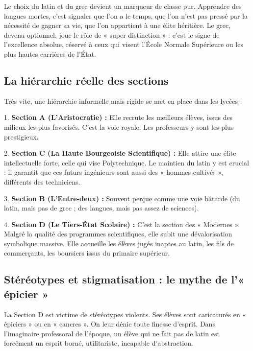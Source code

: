 Le choix du latin et du grec devient un marqueur de classe pur. Apprendre des langues mortes, c'est
signaler que l'on a le temps, que l'on n'est pas pressé par la nécessité de gagner sa vie, que l'on
appartient à une élite héritière. Le grec, devenu optionnel, joue le rôle de « super-distinction » :
c'est le signe de l'excellence absolue, réservé à ceux qui visent l'École Normale Supérieure ou les
plus hautes carrières de l'État.\cite{I-2-1-ref6}



\subsection{La hiérarchie réelle des sections}

Très vite, une hiérarchie informelle mais rigide se met en place dans les lycées :

1. \textbf{Section A (L'Aristocratie) :} Elle recrute les meilleurs élèves, issus des milieux les
plus favorisés. C'est la voie royale. Les professeurs y sont les plus prestigieux.

2. \textbf{Section C (La Haute Bourgeoisie Scientifique) :} Elle attire une élite intellectuelle
forte, celle qui vise Polytechnique. Le maintien du latin y est crucial : il garantit que ces futurs
ingénieurs sont aussi des « hommes cultivés », différents des techniciens.\cite{I-2-1-ref5}

3. \textbf{Section B (L'Entre-deux) :} Souvent perçue comme une voie bâtarde (du latin, mais pas de
grec ; des langues, mais pas assez de sciences).

4. \textbf{Section D (Le Tiers-État Scolaire) :} C'est la section des « Modernes ». Malgré la
qualité des programmes scientifiques, elle subit une dévalorisation symbolique massive. Elle
accueille les élèves jugés inaptes au latin, les fils de commerçants, les boursiers issus du
primaire supérieur.



\subsection{Stéréotypes et stigmatisation : le mythe de l'« épicier »}

La Section D est victime de stéréotypes violents. Ses élèves sont caricaturés en « épiciers » ou en
« cancres ».\cite{I-2-1-ref25} On leur dénie toute finesse d'esprit. Dans l'imaginaire professoral
de l'époque, un élève qui ne fait pas de latin est forcément un esprit borné, utilitariste,
incapable d'abstraction.

